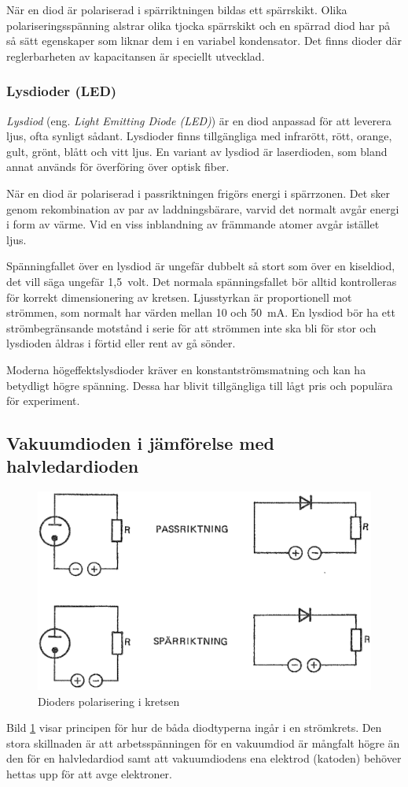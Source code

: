   När en diod är polariserad i spärriktningen bildas ett spärrskikt.
  Olika polariseringsspänning alstrar olika tjocka spärrskikt och en spärrad diod
  har på så sätt egenskaper som liknar dem i en variabel kondensator. Det finns
  dioder där reglerbarheten av kapacitansen är speciellt utvecklad.

\subsubsection{Lysdioder (LED)}

\emph{Lysdiod} (eng. \emph{Light Emitting Diode (LED)}) är en diod anpassad för
att leverera ljus, ofta synligt sådant.
Lysdioder finns tillgängliga med infrarött, rött, orange, gult, grönt,
blått och vitt ljus.
En variant av lysdiod är laserdioden, som bland annat används för överföring
över optisk fiber.

När en diod är polariserad i passriktningen frigörs energi i spärrzonen.
Det sker genom rekombination av par av laddningsbärare, varvid det normalt avgår
energi i form av värme.
Vid en viss inblandning av främmande atomer avgår istället ljus.

Spänningfallet över en lysdiod är ungefär dubbelt så stort som över en
kiseldiod, det vill säga ungefär 1,5~volt.
Det normala spänningsfallet bör alltid kontrolleras för korrekt dimensionering
av kretsen.
Ljusstyrkan är proportionell mot strömmen, som normalt har värden mellan 10 och 50~mA.
En lysdiod bör ha ett strömbegränsande motstånd i serie för att strömmen
inte ska bli för stor och lysdioden åldras i förtid eller rent av gå sönder.

Moderna högeffektslysdioder kräver en konstantströmsmatning och kan ha betydligt
högre spänning.
Dessa har blivit tillgängliga till lågt pris och populära för experiment.

\subsection{Vakuumdioden i jämförelse med halvledardioden}

\begin{figure}
\includegraphics[width=\textwidth]{images/cropped_pdfs/bild_2_2-15.pdf}
\caption{Dioders polarisering i kretsen}
\label{fig:BildII2-15}
\end{figure}

Bild \ref{fig:BildII2-15} visar principen för hur de båda diodtyperna ingår i
en strömkrets.
Den stora skillnaden är att arbetsspänningen för en vakuumdiod är mångfalt
högre än den för en halvledardiod samt att vakuumdiodens ena elektrod (katoden)
behöver hettas upp för att avge elektroner.
